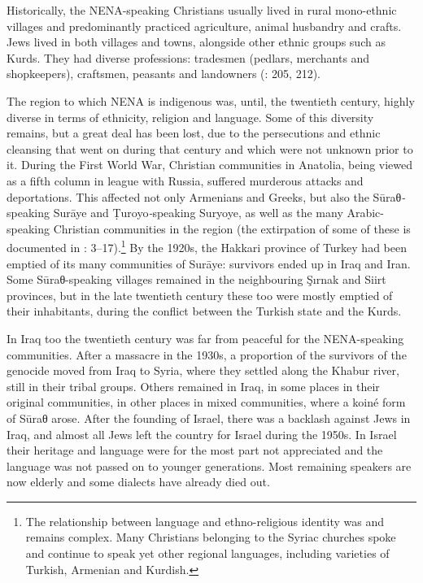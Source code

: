 \documentclass[output=paper]{langsci/langscibook}
\begin{document}
Historically, the NENA-speaking Christians usually lived in rural mono-ethnic villages and predominantly practiced agriculture, animal husbandry and crafts. Jews lived in both villages and towns, alongside other ethnic groups such as Kurds. They had diverse professions: tradesmen (pedlars, merchants and shopkeepers), craftsmen, peasants and landowners (\citealt{BrauerPatai1993}: 205, 212).

The region to which NENA is indigenous was, until, the twentieth century, highly diverse in terms of ethnicity, religion and language. Some of this diversity remains, but a great deal has been lost, due to the persecutions and ethnic cleansing that went on during that century and which were not unknown prior to it. During the First World War, Christian communities in Anatolia, being viewed as a fifth column in league with Russia, suffered murderous attacks and deportations. This affected not only Armenians and Greeks, but also the Sūraθ\textit{{}-}speaking Surāye and Ṭuroyo\textit{{}-}speaking Suryoye, as well as the many Arabic-speaking Christian communities in the region (the extirpation of some of these is documented in \citealt{Jastrow1978}: 3–17).\footnote{The relationship between language and ethno-religious identity was and remains complex. Many Christians belonging to the Syriac churches spoke and continue to speak yet other regional languages, including varieties of Turkish, Armenian and Kurdish.} By the 1920s, the Hakkari province of Turkey had been emptied of its many communities of Surāye: survivors ended up in Iraq and Iran. Some Sūraθ-speaking villages remained in the neighbouring Şırnak and Siirt provinces, but in the late twentieth century these too were mostly emptied of their inhabitants, during the conflict between the Turkish state and the Kurds.

In Iraq too the twentieth century was far from peaceful for the NENA-speaking communities. After a massacre in the 1930s, a proportion of the survivors of the genocide moved from Iraq to Syria, where they settled along the Khabur river, still in their tribal groups. Others remained in Iraq, in some places in their original communities, in other places in mixed communities, where a koiné form of Sūraθ arose. After the founding of Israel, there was a backlash against Jews in Iraq, and almost all Jews left the country for Israel during the 1950s. In Israel their heritage and language were for the most part not appreciated and the language was not passed on to younger generations. Most remaining speakers are now elderly and some dialects have already died out.
\end{document}

